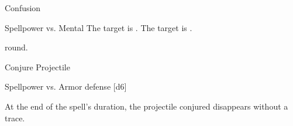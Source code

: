 \begin{spellsection}[Lesser]{Confusion}
    \begin{spellheader}
    \end{spellheader}
    \begin{spellcontent}
        \begin{spelltargetinginfo}
        \end{spelltargetinginfo}
        \begin{spelleffects}
            \begin{spellattack}{Spellpower vs. Mental}
                \spellsuccess The target is \disoriented.
                \spellcritical The target is \confused.
            \end{spellattack}
             round.
        \end{spelleffects}
    \end{spellcontent}
    \begin{spellfooter}
        \spellnotes \norepeatspellnotes
    \end{spellfooter}
\end{spellsection}

\begin{spellsection}{Conjure Projectile}
    \begin{spellheader}
    \end{spellheader}
    \begin{spellcontent}
        \begin{spelltargetinginfo}
        \end{spelltargetinginfo}
        \begin{spelleffects}
            \begin{spellattack}{Spellpower vs. Armor defense}
                \spellsuccess {}[d6]
            \end{spellattack}
        \end{spelleffects}
    \end{spellcontent}
    \begin{spellfooter}
        \spellnotes At the end of the spell's duration, the projectile conjured disappears without a trace.

        \physicalspellnotes
    \end{spellfooter}
\end{spellsection}

